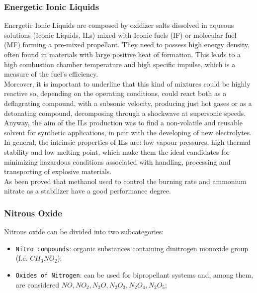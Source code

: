 \documentclass[a4paper]{report}
\begin{document}
\subsubsection{Energetic Ionic Liquids}

Energetic Ionic Liquids are composed by oxidizer salts dissolved in aqueous solutions (Iconic Liquids, ILs) mixed with Iconic fuels (IF) or molecular fuel (MF) forming a pre-mixed propellant. %
They need to possess high energy density, often found in materials with large positive heat of formation. This leads to a high combustion chamber temperature and high specific impulse, which is a measure of the fuel's efficiency. \\ %
Moreover, it is important to underline that this kind of mixtures could be highly reactive so, depending on the operating conditions, could react both as a deflagrating compound, with a subsonic velocity, producing just hot gases or as a detonating compound, decomposing through a shockwave at supersonic speeds.\\
Anyway, the aim of the ILs production was to find a non-volatile and reusable solvent for synthetic applications, in pair with the developing of new electrolytes. In general, the intrinsic properties of ILs are: low vapour pressures, high thermal stability and low melting point, which make them the ideal candidates for minimizing hazardous conditions associated with handling, processing and transporting of explosive materials. \\ %
As been proved that methanol used to control the burning rate and ammonium nitrate as a stabilizer have a good performance degree. \\ %

\subsubsection{Nitrous Oxide}

Nitrous oxide can be divided into two subcategories: 

\begin{itemize}
\item \texttt{Nitro compounds}: organic substances containing dinitrogen monoxide group (f.e. $CH_3NO_2$);
\item \texttt{Oxides of Nitrogen}: can be used for bipropellant systems and, among them, are considered $NO,NO_2, N_2O, N_2O_3, N_2O_4, N_2O_5$;
\end{itemize}
\end{document}
